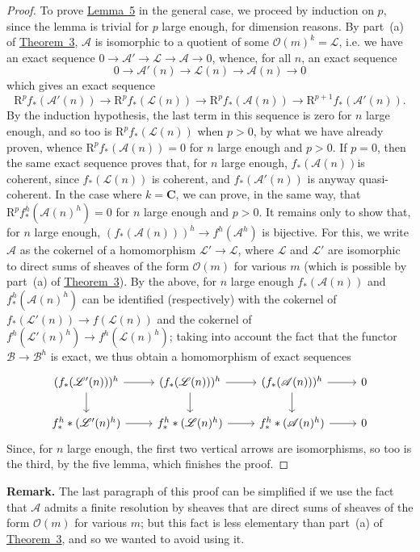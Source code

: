 \documentclass{article}
\newenvironment{rmenv}[1]
  {\smallskip\noindent\textbf{#1.}\rmfamily}
  {\smallskip}
\newcommand{\scr}[1]{{\mathscr{#1}}}
\newcommand{\RR}{\mathrm{R}}
\newcommand{\oldpage}[1]{\marginpar{\footnotesize$\Big\vert$ \textit{p.~#1}}}
\begin{document}
\begin{proof}
  To prove \hyperref[lemma5]{Lemma~5} in the general case, we proceed by induction on $p$, since the lemma is trivial for $p$ large enough, for dimension reasons.
  By part~(a) of \hyperref[theorem3]{Theorem~3}, $\scr{A}$ is isomorphic to a quotient of some $\scr{O}(m)^k=\scr{L}$, i.e. we have an exact sequence $0\to\scr{A}'\to\scr{L}\to\scr{A}\to0$, whence, for all $n$, an exact sequence
  \[
    0 \to \scr{A}'(n) \to \scr{L}(n) \to \scr{A}(n) \to 0
  \]
  which gives an exact sequence
  \[
    \RR^pf_*(\scr{A}'(n))
    \to \RR^pf_*(\scr{L}(n))
    \to \RR^pf_*(\scr{A}(n))
    \to \RR^{p+1}f_*(\scr{A}'(n)).
  \]
  By the induction hypothesis, the last term in this sequence is zero for $n$ large enough, and so too is $\RR^pf_*(\scr{L}(n))$ when $p>0$, by what we have already proven, whence $\RR^pf_*(\scr{A}(n))=0$ for $n$ large enough and $p>0$.
  If $p=0$, then the same exact sequence proves that, for $n$ large enough, $f_*(\scr{A}(n))$is coherent, since $f_*(\scr{L}(n))$ is coherent, and $f_*(\scr{A}'(n))$ is anyway quasi-coherent.
  In the case where $k=\mathbf{C}$, we can prove, in the same way, that $\RR^pf_*^h(\scr{A}(n)^h)=0$ for $n$ large enough and $p>0$.
  It remains only to show that, for $n$ large enough, $(f_*(\scr{A}(n)))^h\to f^h(\scr{A}^h)$ is bijective.
  For this, we write $\scr{A}$ as the cokernel of a homomorphism $\scr{L}'\to\scr{L}$, where $\scr{L}$ and $\scr{L}'$ are isomorphic to direct sums of sheaves of the form $\scr{O}(m)$ for various $m$ (which is possible by part~(a) of \hyperref[theorem3]{Theorem~3}).
  By the above, for $n$ large enough $f_*(\scr{A}(n))$ and $f_*^h(\scr{A}(n)^h)$ can be identified (respectively) with the cokernel of $f_*(\scr{L}'(n))\to f(\scr{L}(n))$ and the cokernel of $f^h(\scr{L}'(n)^h)\to f^h(\scr{L}(n)^h)$;
  taking into account the fact that the functor $\scr{B}\to\scr{B}^h$ is exact, we thus obtain a homomorphism of exact sequences
  \[
    \begin{tikzcd}
      (f_*(\scr{L}'(n)))^h \ar[r] \ar[d]
      & (f_*(\scr{L}(n)))^h \ar[r] \ar[d]
      & (f_*(\scr{A}(n)))^h \ar[r] \ar[d]
      & 0
    \\f_*^h*(\scr{L}'(n)^h) \ar[r]
      & f_*^h*(\scr{L}(n)^h) \ar[r]
      & f_*^h*(\scr{A}(n)^h) \ar[r]
      & 0
    \end{tikzcd}
  \]
\oldpage{2-14}
  Since, for $n$ large enough, the first two vertical arrows are isomorphisms, so too is the third, by the five lemma, which finishes the proof.
\end{proof}

\begin{rmenv}{Remark}
  The last paragraph of this proof can be simplified if we use the fact that $\scr{A}$ admits a finite resolution by sheaves that are direct sums of sheaves of the form $\scr{O}(m)$ for various $m$;
  but this fact is less elementary than part~(a) of \hyperref[theorem3]{Theorem~3}, and so we wanted to avoid using it.
\end{rmenv}
\end{document}
